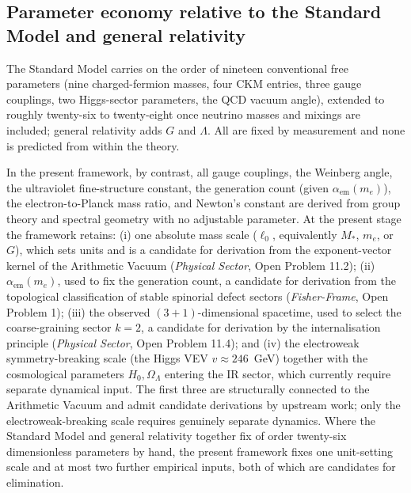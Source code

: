 \documentclass[11pt]{article}
\begin{document}
\subsection*{Parameter economy relative to the Standard Model and general relativity}

The Standard Model carries on the order of nineteen conventional free parameters (nine charged-fermion masses, four CKM entries, three gauge couplings, two Higgs-sector parameters, the QCD vacuum angle), extended to roughly twenty-six to twenty-eight once neutrino masses and mixings are included; general relativity adds $G$ and $\Lambda$. All are fixed by measurement and none is predicted from within the theory.

In the present framework, by contrast, all gauge couplings, the Weinberg angle, the ultraviolet fine-structure constant, the generation count (given $\alpha_{\mathrm{em}}(m_e)$), the electron-to-Planck mass ratio, and Newton's constant are derived from group theory and spectral geometry with no adjustable parameter. At the present stage the framework retains: (i) one absolute mass scale ($\ell_0$, equivalently $M_*$, $m_e$, or $G$), which sets units and is a candidate for derivation from the exponent-vector kernel of the Arithmetic Vacuum (\emph{Physical Sector}, Open Problem 11.2); (ii) $\alpha_{\mathrm{em}}(m_e)$, used to fix the generation count, a candidate for derivation from the topological classification of stable spinorial defect sectors (\emph{Fisher-Frame}, Open Problem 1); (iii) the observed $(3{+}1)$-dimensional spacetime, used to select the coarse-graining sector $k=2$, a candidate for derivation by the internalisation principle (\emph{Physical Sector}, Open Problem 11.4); and (iv) the electroweak symmetry-breaking scale (the Higgs VEV $v\approx246$~GeV) together with the cosmological parameters $H_0,\Omega_\Lambda$ entering the IR sector, which currently require separate dynamical input. The first three are structurally connected to the Arithmetic Vacuum and admit candidate derivations by upstream work; only the electroweak-breaking scale requires genuinely separate dynamics. Where the Standard Model and general relativity together fix of order twenty-six dimensionless parameters by hand, the present framework fixes one unit-setting scale and at most two further empirical inputs, both of which are candidates for elimination.
\end{document}
